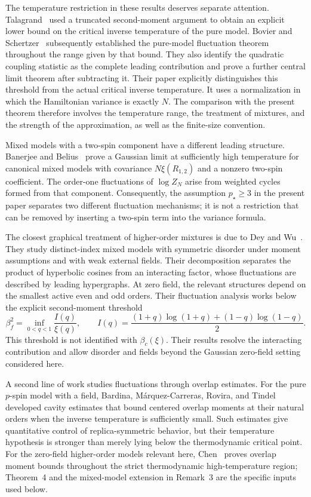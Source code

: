 \documentclass[letterpaper,11pt,reqno]{amsart}
\renewcommand{\geq}{\geqslant}
\begin{document}
The temperature restriction in these results deserves separate
attention. Talagrand~\cite{Talagrand2000} used a truncated
second-moment argument to obtain an explicit lower bound on the
critical inverse temperature of the pure model. Bovier and
Schertzer~\cite{BovierSchertzer2024} subsequently established the
pure-model fluctuation theorem throughout the range given by that
bound. They also identify the quadratic coupling statistic as the
complete leading contribution and prove a further central limit
theorem after subtracting it. Their paper explicitly distinguishes
this threshold from the actual critical inverse temperature. It uses
a normalization in which the Hamiltonian variance is exactly $N$.
The comparison with the present theorem therefore involves the
temperature range, the treatment of mixtures, and the strength of the
approximation, as well as the finite-size convention.

Mixed models with a two-spin component have a different leading
structure. Banerjee and Belius~\cite{BanerjeeBelius2021} prove a
Gaussian limit at sufficiently high temperature for canonical mixed
models with covariance $N\xi(R_{1,2})$ and a nonzero two-spin
coefficient. The order-one fluctuations of $\log Z_N$ arise from
weighted cycles formed from that component. Consequently, the
assumption $p_\star\geq3$ in the present paper separates two different
fluctuation mechanisms; it is not a restriction that can be removed
by inserting a two-spin term into the variance formula.

The closest graphical treatment of higher-order mixtures is due to
Dey and Wu~\cite{DeyWuHypergraphs}. They study distinct-index mixed
models with symmetric disorder under moment assumptions and with weak
external fields. Their decomposition separates the product of
hyperbolic cosines from an interacting factor, whose
fluctuations are described by leading hypergraphs. At zero field,
the relevant structures depend on the smallest active even and odd
orders. Their fluctuation analysis works below the explicit
second-moment threshold
\begin{equation*}
\beta_f^2=\inf_{0<q<1}\frac{I(q)}{\xi(q)},
\qquad
I(q)=\frac{(1+q)\log(1+q)+(1-q)\log(1-q)}2.
\end{equation*}
This threshold is not identified with $\beta_c(\xi)$. Their results
resolve the interacting contribution and allow disorder and fields beyond
the Gaussian zero-field setting considered here.

A second line of work studies fluctuations through overlap estimates.
For the pure $p$-spin model with a field, Bardina,
M\'arquez-Carreras, Rovira, and Tindel~\cite{BardinaEtAl2004} developed
cavity estimates that bound centered overlap moments at their natural
orders when the inverse temperature is sufficiently small. Such
estimates give quantitative control of replica-symmetric behavior,
but their temperature hypothesis is stronger than merely lying below
the thermodynamic critical point. For the zero-field higher-order
models relevant here, Chen~\cite{ChenHighTemperature} proves overlap
moment bounds throughout the strict thermodynamic high-temperature
region; Theorem~4 and the mixed-model extension in Remark~3 are the
specific inputs used below.
\end{document}
